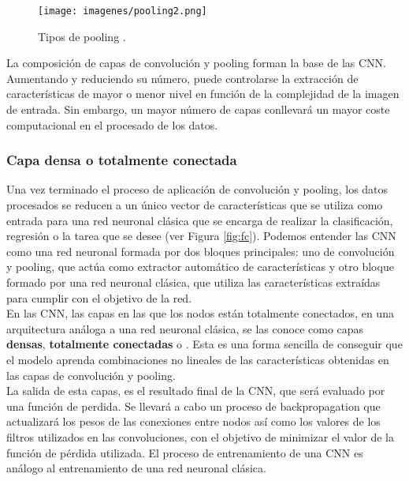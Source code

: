 \begin{figure}[ht!]
    \centering
    \texttt{[image: imagenes/pooling2.png]}
    \caption[Tipos de pooling.]{Tipos de pooling \cite{yani2019application}.}
    \label{fig:pooling}
\end{figure}

La composición de capas de convolución y pooling forman la base de las CNN. Aumentando y reduciendo su número, puede controlarse la extracción de características de mayor o menor nivel en función de la complejidad de la imagen de entrada. Sin embargo, un mayor número de capas conllevará un mayor coste computacional en el procesado de los datos.

\subsubsection{Capa densa o totalmente conectada}

Una vez terminado el proceso de aplicación de convolución y pooling, los datos procesados se reducen a un único vector de características que se utiliza como entrada para una red neuronal clásica que se encarga de realizar la clasificación, regresión o la tarea que se desee (ver Figura \ref{fig:fc}).
Podemos entender las CNN como una red neuronal formada por dos bloques principales: uno de convolución y pooling, que actúa como extractor automático de características y otro bloque formado por una red neuronal clásica, que utiliza las características extraídas para cumplir con el objetivo de la red.\\

En las CNN, las capas en las que los nodos están totalmente conectados, en una arquitectura análoga a una red neuronal clásica, se las conoce como capas \textbf{densas}, \textbf{totalmente conectadas} o . Esta es una forma sencilla de conseguir que el modelo aprenda combinaciones no lineales de las características obtenidas en las capas de convolución y pooling.\\

La salida de esta capas, es el resultado final de la CNN, que será evaluado por una función de perdida. Se llevará a cabo un proceso de backpropagation que actualizará los pesos de las conexiones entre nodos así como los valores de los filtros utilizados en las convoluciones, con el objetivo de minimizar el valor de la función de pérdida utilizada. El proceso de entrenamiento de una CNN es análogo al entrenamiento de una red neuronal clásica.


